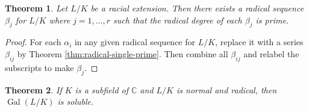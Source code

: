 \documentclass[12pt]{article}
\newtheorem{theorem}{Theorem}
\newcommand{\Gal}{\operatorname{Gal}}
\begin{document}
\begin{theorem} \label{thm:radical-all-prime}
    Let $L / K$ be a racial extension. Then there exists a radical sequence $\beta_j$ for $L / K$ where $j=1, \dots, r$ such that the radical degree of each $\beta_j$ is prime.
\end{theorem}

\begin{proof}
    For each $\alpha_i$ in any given radical sequence for $L / K$, replace it with a series $\beta_{ij}$ by Theorem \ref{thm:radical-single-prime}. Then combine all $\beta_{ij}$ and relabel the subscripts to make $\beta_{j}$. 
\end{proof}

\begin{theorem} \label{thm:radical-3}
If $K$ is a subfield of $\mathbb{C}$ and $L / K$ is normal and radical, then $\Gal(L / K)$ is soluble.
\end{theorem}
\end{document}
